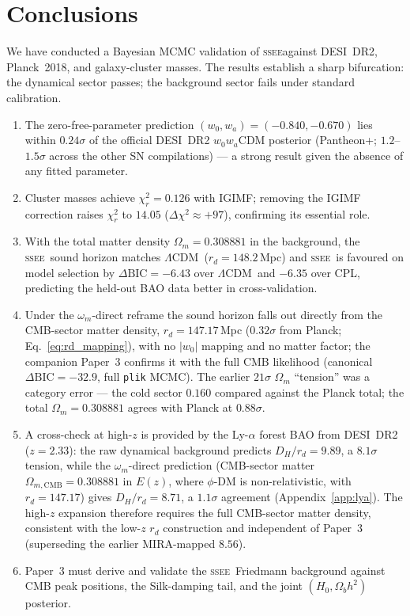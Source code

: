 \documentclass[12pt,a4paper]{article}
\newcommand{\SSEE}{\ifmmode\mathrm{SSEE}\else\textsc{ssee}\fi}
\newcommand{\LCDM}{\ifmmode\Lambda\mathrm{CDM}\else$\Lambda$CDM\fi}
\newcommand{\wz}{w_0}
\newcommand{\wa}{w_a}
\begin{document}
\section{Conclusions}
\label{sec:conclusions}

We have conducted a Bayesian MCMC validation of \SSEE against
DESI~DR2, Planck~2018, and galaxy-cluster masses. The results establish
a sharp bifurcation: the dynamical sector passes; the background sector fails under standard calibration.

\begin{enumerate}
  \item The zero-free-parameter prediction $(\wz,\wa)=(-0.840,-0.670)$
    lies within $0.24\sigma$ of the official DESI~DR2 $w_0w_a$CDM posterior
    (Pantheon+; $1.2$--$1.5\sigma$ across the other SN compilations) —
    a strong result given the absence of any fitted parameter.

  \item Cluster masses achieve $\chi^2_r=0.126$ with IGIMF; removing
    the IGIMF correction raises $\chi^2_r$ to $14.05$
    ($\Delta\chi^2\approx+97$), confirming its essential role.

  \item With the total matter density $\Omega_m=0.308881$ in the background,
    the \SSEE\ sound horizon matches \LCDM\ ($r_d=148.2$\,Mpc) and \SSEE\ is
    favoured on model selection by $\Delta\mathrm{BIC}=-6.43$ over \LCDM\ and
    $-6.35$ over CPL, predicting the held-out BAO data better in
    cross-validation.

  \item Under the $\omega_m$-direct reframe the sound horizon falls out
    directly from the CMB-sector matter density,
    $r_d=147.17$\,Mpc ($0.32\sigma$ from Planck; Eq.~\ref{eq:rd_mapping}),
    with no $|w_0|$ mapping and no matter factor; the companion Paper~3
    confirms it with the full CMB likelihood (canonical $\Delta\mathrm{BIC}=-32.9$,
    full \texttt{plik} MCMC). The earlier $21\sigma$ $\Omega_m$ ``tension'' was a
    category error --- the cold sector $0.160$ compared against the Planck total;
    the total $\Omega_m=0.308881$ agrees with Planck at $0.88\sigma$.

  \item A cross-check at high-$z$ is provided by the Ly-$\alpha$ forest BAO
    from DESI~DR2 ($z=2.33$): the raw dynamical background predicts
    $D_H/r_d = 9.89$, a $8.1\sigma$ tension, while the $\omega_m$-direct
    prediction (CMB-sector matter $\Omega_{m,\mathrm{CMB}}=0.308881$ in $E(z)$,
    where $\phi$-DM is non-relativistic, with $r_d=147.17$) gives
    $D_H/r_d = 8.71$, a $1.1\sigma$ agreement (Appendix~\ref{app:lya}).
    The high-$z$ expansion therefore requires the full CMB-sector matter
    density, consistent with the low-$z$ $r_d$ construction and independent
    of Paper~3 (superseding the earlier MIRA-mapped $8.56$).

  \item Paper~3 must derive and validate the \SSEE\ Friedmann background
    against CMB peak positions, the Silk-damping tail, and the joint
    $(H_0,\Omega_b h^2)$ posterior.
\end{enumerate}
\end{document}
